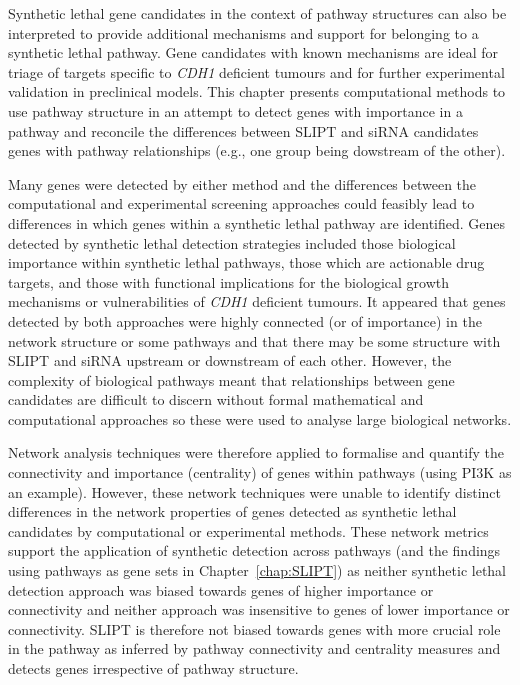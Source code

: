 Synthetic lethal gene candidates in the context of pathway structures can also be interpreted to provide additional mechanisms and support for belonging to a synthetic lethal pathway. Gene candidates with known mechanisms are ideal for triage of targets specific to \textit{CDH1} deficient tumours and for further experimental validation in preclinical models. This chapter presents computational methods to use pathway structure in an attempt to detect genes with importance in a pathway and reconcile the differences between \gls{SLIPT} and \gls{siRNA} candidates genes with pathway relationships (e.g., one group being dowstream of the other).

Many genes were detected by either method and the differences between the computational and experimental screening approaches could feasibly lead to differences in which genes within a synthetic lethal pathway are identified. Genes detected by synthetic lethal detection strategies included those biological importance within synthetic lethal pathways, those which are actionable drug targets, and those with functional implications for the biological growth mechanisms or vulnerabilities of \textit{CDH1} deficient tumours. It appeared that genes detected by both approaches were highly connected (or of importance) in the network structure or some pathways and that there may be some structure with \gls{SLIPT} and \gls{siRNA} upstream or downstream of each other. However, the complexity of biological pathways meant that relationships between gene candidates are difficult to discern without formal mathematical and computational approaches so these were used to analyse large biological networks.

Network analysis techniques were therefore applied to formalise and quantify the connectivity and importance (centrality) of genes within pathways (using PI3K as an example). However, these network techniques were unable to identify distinct differences in the network properties of genes detected as synthetic lethal candidates by computational or experimental methods. These network metrics support the application of synthetic detection across pathways (and the findings using pathways as gene sets in Chapter~\ref{chap:SLIPT}) as neither synthetic lethal detection approach was biased towards genes of higher importance or connectivity and neither approach was insensitive to genes of lower  importance or connectivity. \gls{SLIPT} is therefore not biased towards genes with more crucial role in the pathway as inferred by pathway connectivity and centrality measures and detects genes irrespective of pathway structure. 

